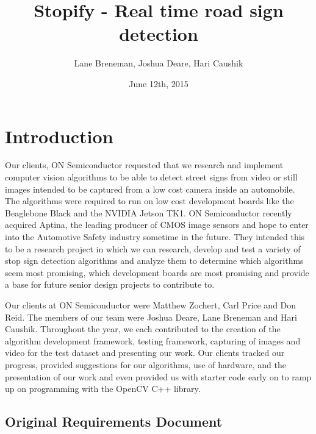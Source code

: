 \documentclass[letterpaper,10pt,titlepage]{article}
\title{Stopify - Real time road sign detection}
\date{June 12th, 2015}
\author{Lane Breneman, Joshua Deare, Hari Caushik}
\begin{document}
\maketitle
\newpage
\setcounter{tocdepth}{5}
\setcounter{secnumdepth}{5}
\tableofcontents
\newpage
{}
\section*{Introduction}
Our clients, ON Semiconductor requested that we research and implement computer
vision algorithms to be able to detect street signs from video or still images
intended to be captured from a low cost camera inside an automobile. The 
algorithms were required to run on low cost development boards like the 
Beaglebone Black and the NVIDIA Jetson TK1. ON Semiconductor recently acquired
Aptina, the leading producer of CMOS image sensors and hope to enter into the
Automotive Safety industry sometime in the future. They intended this to be a 
research project in which we can research, develop and test a variety of stop 
sign detection algorithms and analyze them to determine which algorithms seem
most promising, which development boards are most promising and provide a base 
for future senior design projects to contribute to.

Our clients at ON Semiconductor were Matthew Zochert, Carl Price and Don Reid.
The members of our team were Joshua Deare, Lane Breneman and Hari Caushik. 
Throughout the year, we each contributed to the creation of the algorithm 
development framework, testing framework, capturing of images and video for 
the test dataset and presenting our work. Our clients tracked our progress,
provided suggestions for our algorithms, use of hardware, and the presentation
of our work and even provided us with starter code early on to ramp up on 
programming with the OpenCV C++ library. 
\newpage

\vspace*{\fill}
\begin{center}
\begin{minipage}{0.6\textwidth}
\section*{Original Requirements Document}
\end{minipage}
\end{center}
\vfill
\end{document}
